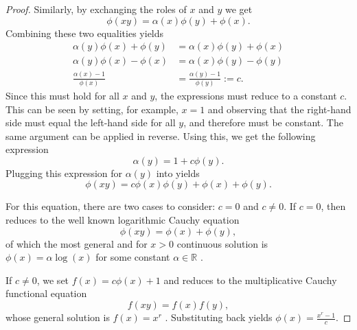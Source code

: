 \begin{proof}
  Similarly, by exchanging the roles of $x$ and $y$ we get
  \begin{equation*}
    \phi(x y) = \alpha(x)\phi(y) + \phi(x).
  \end{equation*}
  Combining these two equalities yields
  \begin{align*}
    \alpha(y)\phi(x) + \phi(y)  &= \alpha(x)\phi(y) + \phi(x) \tag{$- \phi(x) - \phi(y)$} \\
    \alpha(y)\phi(x) - \phi(x)  &= \alpha(x)\phi(y) - \phi(y) \tag{divide \footnotemark by $\phi(x) \cdot \phi(y)$} \\
    \frac{\alpha(x) -1}{\phi(x)} &= \frac{\alpha(y) - 1}{\phi(y)} := c.
  \end{align*} 
  Since this must hold for all $x$ and $y$, the expressions must reduce to a constant $c$. This can be seen by setting, for example, $x=1$ and observing that the right-hand side must equal the left-hand side for all $y$, and therefore must be constant. The same argument can be applied in reverse.
  Using this, we get the following expression
  \begin{equation*}
    \alpha(y) = 1 + c \phi(y).
  \end{equation*}
  Plugging this expression for $\alpha(y)$ into  yields
  \begin{equation} \label{proof-quasi-eq1}
    \phi(xy) = c \phi(x) \phi(y) + \phi(x) + \phi(y).
  \end{equation}

  For this equation, there are two cases to consider: $c=0$ and $c \neq 0$.
  If $c=0$, then  reduces to the well known logarithmic Cauchy equation
  $$  \phi(xy) = \phi(x) + \phi(y), $$
  of which the most general and for $x>0$ continuous solution is $\phi(x) = \alpha \log(x)$ for some constant $\alpha \in \mathbb{R}$ \parencites[p. 39]{aczel1966lectures}[p. 110-111]{cauchy1821}.

  If $c \neq 0$, we set $f(x) = c \phi(x) + 1$ and  reduces to the multiplicative Cauchy functional equation
  $$ f(xy) = f(x)f(y), $$
  whose general solution is $f(x) = x^r$ \parencites[p. 39]{aczel1966lectures}[p. 111-112]{cauchy1821}. Substituting back yields $\phi(x) = \frac{x^r -1}{c}$.
\end{proof}



